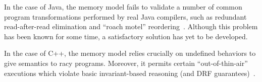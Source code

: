 In the case of Java, the memory model fails to validate a number of
common program transformations performed by real Java compilers, such
as redundant read-after-read elimination and ``roach motel''
reordering~\cite{sevcik:jmm}.  Although this problem has been known
for some time, a satisfactory solution has yet to be developed.

In the case of C++, the memory model relies crucially on undefined
behaviors to give semantics to racy programs.  Moreover, it permits
certain ``out-of-thin-air'' executions which violate basic
invariant-based reasoning (and DRF guarantees)~\cite{Boehm2014}.






